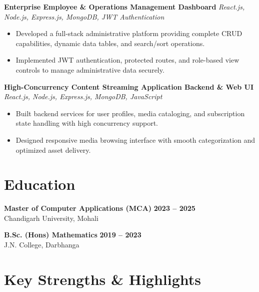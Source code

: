 \documentclass[a4paper,10pt]{article}
\begin{document}
\textbf{Enterprise Employee \& Operations Management Dashboard}
\hfill
\textit{React.js, Node.js, Express.js, MongoDB, JWT Authentication}

\begin{itemize}

    \item Developed a full-stack administrative platform providing complete CRUD capabilities, dynamic data tables, and search/sort operations.

    \item Implemented JWT authentication, protected routes, and role-based view controls to manage administrative data securely.

\end{itemize}


\textbf{High-Concurrency Content Streaming Application Backend \& Web UI}
\hfill
\textit{React.js, Node.js, Express.js, MongoDB, JavaScript}

\begin{itemize}

    \item Built backend services for user profiles, media cataloging, and subscription state handling with high concurrency support.

    \item Designed responsive media browsing interface with smooth categorization and optimized asset delivery.

\end{itemize}

\section*{Education}

\textbf{Master of Computer Applications (MCA)}
\hfill
\textbf{2023 -- 2025}
\\
Chandigarh University, Mohali

\vspace{3pt}

\textbf{B.Sc. (Hons) Mathematics}
\hfill
\textbf{2019 -- 2023}
\\
J.N. College, Darbhanga

\section*{Key Strengths \& Highlights}
\end{document}
